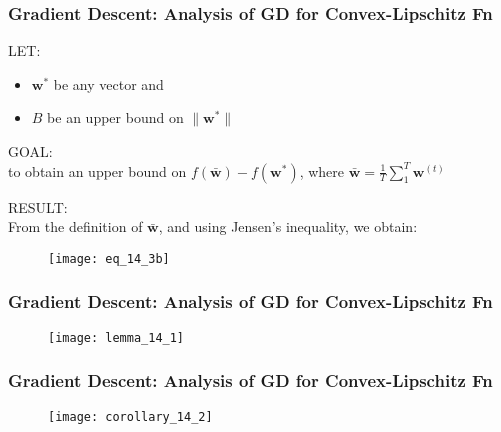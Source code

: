 \begin{frame}
\frametitle{Gradient Descent: Analysis of GD for Convex-Lipschitz Fn}

LET:
\begin{itemize}
\item $\mathbf{w^*}$ be any vector and
\item $B$ be an upper bound on $\parallel \mathbf{w^*} \parallel$
\end{itemize}
\vspace{5mm}

GOAL:\\
to obtain an upper bound on  $f(\bar{\mathbf{w}}) - f(\mathbf{w^*})$,
where $\bar{\mathbf{w}} = \frac{1}{T} \sum_{1}^{T} \mathbf{w}^{(t)}$
\vspace{5mm}

RESULT:\\
From the definition of $\bar{\mathbf{w}}$, and using Jensen's inequality, we obtain:
\begin{figure}
    \centering
    \texttt{[image: eq\_14\_3b]}
\end{figure}

\end{frame}

\begin{frame}
\frametitle{Gradient Descent: Analysis of GD for Convex-Lipschitz Fn}

\begin{figure}
    \centering
    \texttt{[image: lemma\_14\_1]}
\end{figure}

\end{frame}

\begin{frame}
\frametitle{Gradient Descent: Analysis of GD for Convex-Lipschitz Fn}

\begin{figure}
    \centering
    \texttt{[image: corollary\_14\_2]}
\end{figure}

\end{frame}

